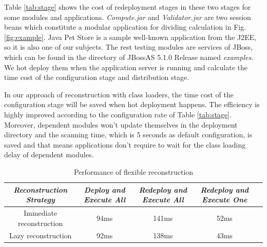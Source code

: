 \documentclass[conference]{IEEEtran}
\begin{document}
Table \ref{tab:stage} shows the cost of redeployment stages in these two stages for some modules and applications.
\emph{Compute.jar} and \emph{Validator.jar} are two session beans which constitute a modular application for dividing calculation in Fig. \ref{fig:example}.
Java Pet Store\cite{java_pet_store} is a sample well-known application from the J2EE\cite{j2ee}, so it is also one of our subjects.
The rest testing modules are services of JBoss, which can be found in the directory of JBossAS 5.1.0 Release named \emph{examples}.
We hot deploy them when the application server is running and calculate the time cost of the configuration stage and distribution stage.

In our approach of reconstruction with class loaders, the time cost of the configuration stage will be saved when hot deployment happens.
The efficiency is highly improved according to the configuration rate of Table \ref{tab:stage}.
Moreover, dependent modules won't update themselves in the deployment directory and the scanning time, which is 5 seconds as default configuration, is saved and that means applications don't require to wait for the class loading delay of dependent modules. 


\begin{table}
\centering
\caption{Performance of flexible reconstruction}
\label{tab:flexibility}
\begin{tabular}{|c|c|c|c|c|}
\hline
\emph{Reconstruction Strategy}	& \emph{Deploy and Execute All}	& \emph{Redeploy and Execute All} & \emph{Redeploy and Execute One}\\
\hline
\hline
Immediate reconstruction 	&	94ms				&	141ms				&	52ms\\
\hline
Lazy reconstruction 	&	92ms				&	138ms				&	43ms\\
\hline
\end{tabular}
\end{table}
\end{document}
